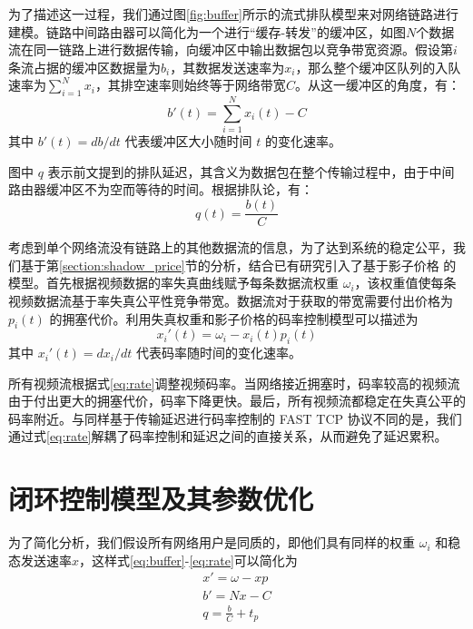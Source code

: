为了描述这一过程，我们通过图\ref{fig:buffer}所示的流式排队模型来对网络链路进行建模。链路中间路由器可以简化为一个进行``缓存-转发''的缓冲区，如图$N$个数据流在同一链路上进行数据传输，向缓冲区中输出数据包以竞争带宽资源。假设第$i$条流占据的缓冲区数据量为$b_i$，其数据发送速率为$x_i$，那么整个缓冲区队列的入队速率为$\sum_{i=1}^N{x_i}$，其排空速率则始终等于网络带宽$C$。从这一缓冲区的角度，有：
\begin{equation}
\label{eq:buffer}
  b'(t) = \sum_{i=1}^N{x_i(t)} - C
\end{equation}
其中 $b'(t)=db/dt$ 代表缓冲区大小随时间 $t$ 的变化速率。

图中 $q$ 表示前文提到的排队延迟，其含义为数据包在整个传输过程中，由于中间路由器缓冲区不为空而等待的时间。根据排队论，有：
\begin{equation}
\label{eq:delay}
    q(t) = \frac{b(t)}{C}
\end{equation}

考虑到单个网络流没有链路上的其他数据流的信息，为了达到系统的稳定公平，我们基于第\ref{section:shadow_price}节的分析，结合已有研究引入了基于影子价格 \cite{kelly1997charging}的模型。首先根据视频数据的率失真曲线\cite{berger1971rate}赋予每条数据流权重 $\omega_i$，该权重值使每条视频数据流基于率失真公平性竞争带宽。数据流对于获取的带宽需要付出价格为 $p_i(t)$ 的拥塞代价。利用失真权重和影子价格的码率控制模型可以描述为
\begin{equation}
\label{eq:rate}
    x_i'(t) = \omega_i - x_i(t)p_i(t)
\end{equation}
其中 $x_i'(t)=dx_i/dt$ 代表码率随时间的变化速率。

所有视频流根据式\ref{eq:rate}调整视频码率。当网络接近拥塞时，码率较高的视频流由于付出更大的拥塞代价，码率下降更快。最后，所有视频流都稳定在失真公平的码率附近。与同样基于传输延迟进行码率控制的 FAST TCP\cite{wei2006fast} 协议不同的是，我们通过式\ref{eq:rate}解耦了码率控制和延迟之间的直接关系，从而避免了延迟累积。


\section{闭环控制模型及其参数优化}
为了简化分析，我们假设所有网络用户是同质的，即他们具有同样的权重 $\omega_i$ 和稳态发送速率$x$，这样式\ref{eq:buffer}-\ref{eq:rate}可以简化为
\begin{eqnarray}
    x' = \omega - xp\label{eq:s_} \\
    b' = Nx - C\\
    q = \frac{b}{C} + t_p \label{eq:rate_}
\end{eqnarray}

